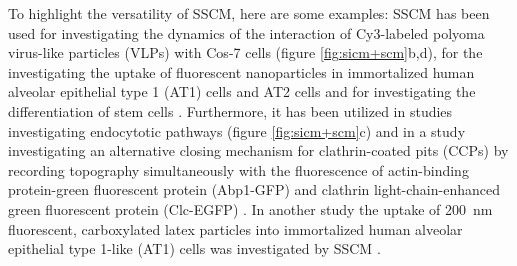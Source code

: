 To highlight the versatility of SSCM, here are some examples: SSCM has been used for investigating the
dynamics of the interaction of Cy3-labeled polyoma virus-like particles (VLPs) with Cos-7 cells 
(figure \ref{fig:sicm+scm}b,d), for the investigating the uptake of fluorescent nanoparticles in 
immortalized human alveolar epithelial type 1 (AT1) cells and AT2 cells \cite{Kemp2008} and for 
investigating the differentiation of stem cells \cite{Gorelik2008}. Furthermore, it has been utilized
in studies investigating endocytotic pathways \cite{Shevchuk2008} (figure \ref{fig:sicm+scm}c) and in
a study investigating an alternative closing mechanism for clathrin-coated pits (CCPs) by recording 
topography simultaneously with the fluorescence of actin-binding protein-green fluorescent protein 
(Abp1-GFP) and clathrin light-chain-enhanced green fluorescent protein (Clc-EGFP) \cite{Shevchuk2012}.
In another study the uptake of 200~nm fluorescent, carboxylated latex particles into immortalized human
alveolar epithelial type 1-like (AT1) cells was investigated by SSCM \cite{Novak2014}. 



%


